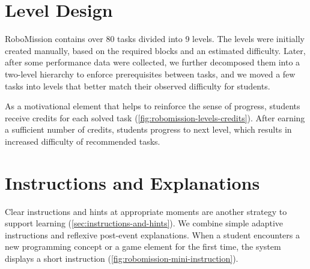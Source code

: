 \section{Level Design}
\label{sec:level-design}


RoboMission contains over 80 tasks divided into 9 levels.
The levels were initially created manually, based on the required blocks
and an estimated difficulty. Later, after some performance data
were collected, we further decomposed them into a two-level
hierarchy to enforce prerequisites between tasks, and we moved
a few tasks into levels that better match their observed
difficulty for students.



As a motivational element that helps to reinforce the sense of progress,
students receive credits for each solved task
(\cref{fig:robomission-levels-credits}).
After earning a sufficient number of credits, students progress to next level,
which results in increased difficulty of recommended tasks.



\section{Instructions and Explanations}
\label{sec:game.explanations}

Clear instructions and hints at appropriate moments
are another strategy to support learning
(\cref{sec:instructions-and-hints}).
We combine simple adaptive instructions and reflexive post-event explanations.
When a student encounters a new programming concept or a game element
for the first time, the system displays a short instruction
(\cref{fig:robomission-mini-instruction}).


